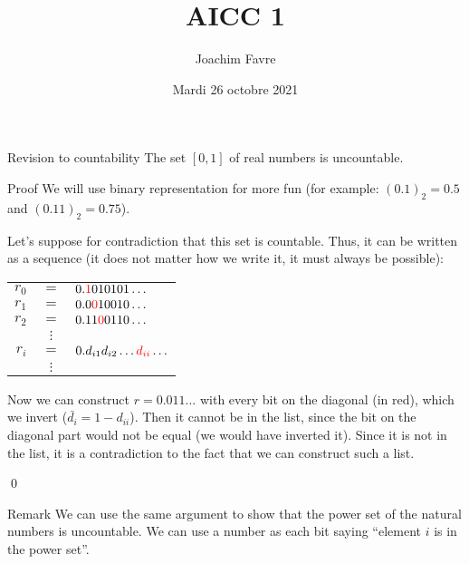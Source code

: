 \documentclass[a4paper]{article}
\title{AICC 1}
\author{Joachim Favre}
\date{Mardi 26 octobre 2021}
\begin{document}
\maketitle


\begin{parag}{Revision to countability}
    The set $\left[0,1\right] $ of real numbers is uncountable.

    \begin{subparag}{Proof}
        We will use binary representation for more fun (for example: $\left(0.1\right)_2 = 0.5$ and $\left(0.11\right)_2 = 0.75$).

        Let's suppose for contradiction that this set is countable. Thus, it can be written as a sequence (it does not matter how we write it, it must always be possible):
    \begin{center}
    \begin{tabular}{rcl}
        $r_0$ & $=$ & $ 0.{\color{red}1}010101\ldots$ \\
        $r_1$ & $=$ & $ 0.0{\color{red}0}10010\ldots$ \\
        $r_2$ & $=$ & $ 0.11{\color{red}0}0110\ldots$ \\
        & $\vdots$ & \\
        $r_i$ & $=$ & $ 0.d_{i1}d_{i2}\ldots {\color{red}d_{ii}} \ldots$  \\
        & $\vdots$ & \\
    \end{tabular}
    \end{center}

    Now we can construct $r = 0.011\ldots$ with every bit on the diagonal (in red), which we invert ($\bar{d_i} = 1 - d_{ii}$). Then it cannot be in the list, since the bit on the diagonal part would not be equal (we would have inverted it). Since it is not in the list, it is a contradiction to the fact that we can construct such a list.

    \qed
    \end{subparag}

    \begin{subparag}{Remark}
        We can use the same argument to show that the power set of the natural numbers is uncountable. We can use a number as each bit saying ``element $i$ is in the power set''.
    \end{subparag}


\end{parag}
\end{document}
